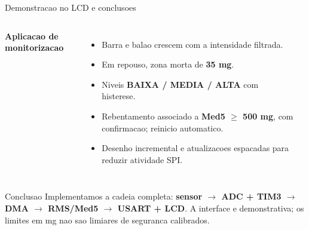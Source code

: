 \documentclass[aspectratio=169,10pt]{beamer}
\newcommand{\etiqueta}[1]{{\color{azul}\bfseries #1}}
\begin{document}
\begin{frame}{Demonstracao no LCD e conclusoes}
\begin{columns}[T,onlytextwidth]
\etiqueta{Aplicacao de monitorizacao}
\begin{itemize}\setlength\itemsep{3pt}
\item Barra e balao crescem com a intensidade filtrada.
\item Em repouso, zona morta de \textbf{35 mg}.
\item Niveis \textbf{BAIXA / MEDIA / ALTA} com histerese.
\item Rebentamento associado a \textbf{Med5 $\geq$ 500 mg}, com confirmacao; reinicio automatico.
\item Desenho incremental e atualizacoes espacadas para reduzir atividade SPI.
\end{itemize}
\centering\etiqueta{Esquema da interface}\\[3mm]
\end{columns}
\vfill
\begin{block}{Conclusao}
Implementamos a cadeia completa: \textbf{sensor $\to$ ADC + TIM3 $\to$ DMA $\to$ RMS/Med5 $\to$ USART + LCD}. A interface e demonstrativa; os limites em mg nao sao limiares de seguranca calibrados.
\end{block}
\end{frame}
\end{document}
